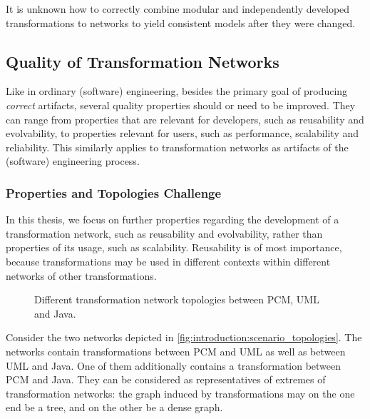 \begin{problemstatement}
    It is unknown how to correctly combine modular and independently developed transformations to networks to yield consistent models after they were changed.
\end{problemstatement}

\subsection{Quality of Transformation Networks}

Like in ordinary (software) engineering, besides the primary goal of producing \emph{correct} artifacts, several quality properties should or need to be improved.
They can range from properties that are relevant for developers, such as reusability and evolvability, to properties relevant for users, such as performance, scalability and reliability.
This similarly applies to transformation networks as artifacts of the (software) engineering process.

\subsubsection*{Properties and Topologies Challenge}

In this thesis, we focus on further properties regarding the development of a transformation network, such as reusability and evolvability, rather than properties of its usage, such as scalability.
Reusability is of most importance, because transformations may be used in different contexts within different networks of other transformations.

\begin{figure}
    \centering
    
    \caption[Example for network topologies]{Different transformation network topologies between \gls{PCM}, \gls{UML} and Java.}
    \label{fig:introduction:scenario_topologies}
\end{figure}

Consider the two networks depicted in \autoref{fig:introduction:scenario_topologies}.
The networks contain transformations between \gls{PCM} and \gls{UML} as well as between \gls{UML} and Java. 
One of them additionally contains a transformation between \gls{PCM} and Java.
They can be considered as representatives of extremes of transformation networks:
the graph induced by transformations may on the one end be a tree, and on the other be a dense graph.

